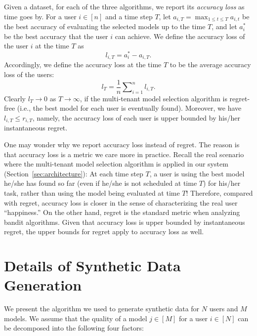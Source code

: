 \documentclass[letterpaper]{vldb}
\begin{document}
Given a dataset, for each of the three algorithms, we report its \emph{accuracy loss} as time goes by.
For a user $i\in[n]$ and a time step $T$, let $a_{i,T}=\max_{1\leq t\leq T} a_{i,t}$ be the best accuracy of evaluating the selected models up to the time $T$, and let $a_i^{*}$ be the best accuracy that the user $i$ can achieve.
We define the accuracy loss of the user $i$ at the time $T$ as
\begin{equation}
l_{i,T}=a_i^{*}-a_{i,T}.
\end{equation}
Accordingly, we define the accuracy loss at the time $T$ to be the average accuracy loss of the users:
\begin{equation}\label{eq:accuracy-loss}
l_T=\frac{1}{n}\sum\nolimits_{i=1}^{n}l_{i,T}.
\end{equation}
Clearly $l_T\to 0$ as $T\to\infty$, if the multi-tenant model selection algorithm is regret-free (i.e., the best model for each user is eventually found).
Moreover, we have $l_{i,T}\leq r_{i,T}$, namely, the accuracy loss of each user is upper bounded by his/her instantaneous regret.

One may wonder why we report accuracy loss instead of regret.
The reason is that accuracy loss is a metric we care more in practice.
Recall the real scenario where the multi-tenant model selection algorithm is applied in our system (Section~\ref{sec:architecture}): At each time step $T$, a user is using the best model he/she has found so far (even if he/she is not scheduled at time $T$) for his/her task, rather than using the model being evaluated at time $T$!
Therefore, compared with regret, accuracy loss is closer in the sense of characterizing the real user ``happiness.''
On the other hand, regret is the standard metric when analyzing bandit algorithms.
Given that accuracy loss is upper bounded by instantaneous regret, the upper bounds for regret apply to accuracy loss as well.%


\section{Details of Synthetic Data Generation}\label{sec:appendix:synthetic}

We present the algorithm we used to generate synthetic data for $N$ users and $M$ models.
We assume that the quality of a model $j\in[M]$ for a user $i\in[N]$ can be decomposed into the following four factors:
\end{document}
